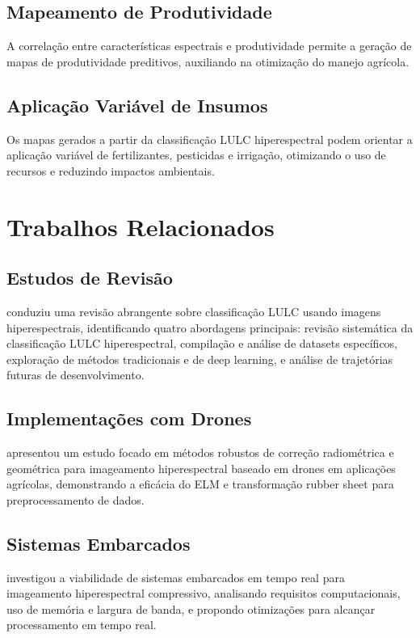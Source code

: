 \subsection{Mapeamento de Produtividade}
A correlação entre características espectrais e produtividade permite a geração de mapas de produtividade preditivos, auxiliando na otimização do manejo agrícola.

\subsection{Aplicação Variável de Insumos}
Os mapas gerados a partir da classificação LULC hiperespectral podem orientar a aplicação variável de fertilizantes, pesticidas e irrigação, otimizando o uso de recursos e reduzindo impactos ambientais.

\section{Trabalhos Relacionados}\label{sec:trabalhos_relacionados}

\subsection{Estudos de Revisão}
\cite{Lou2024} conduziu uma revisão abrangente sobre classificação LULC usando imagens hiperespectrais, identificando quatro abordagens principais: revisão sistemática da classificação LULC hiperespectral, compilação e análise de datasets específicos, exploração de métodos tradicionais e de deep learning, e análise de trajetórias futuras de desenvolvimento.

\subsection{Implementações com Drones}
\cite{Shin2024} apresentou um estudo focado em métodos robustos de correção radiométrica e geométrica para imageamento hiperespectral baseado em drones em aplicações agrícolas, demonstrando a eficácia do ELM e transformação rubber sheet para preprocessamento de dados.

\subsection{Sistemas Embarcados}
\cite{Lim2022} investigou a viabilidade de sistemas embarcados em tempo real para imageamento hiperespectral compressivo, analisando requisitos computacionais, uso de memória e largura de banda, e propondo otimizações para alcançar processamento em tempo real.

